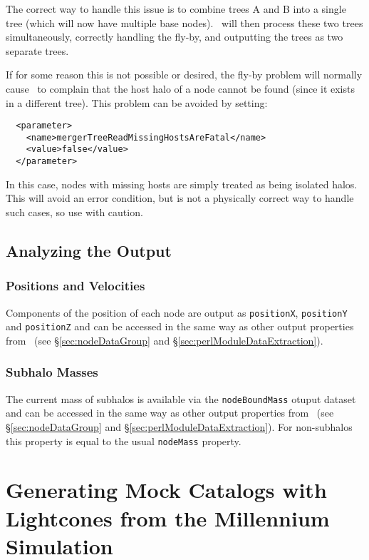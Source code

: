 The correct way to handle this issue is to combine trees A and B into a single tree (which will now have multiple base nodes). \glc\ will then process these two trees simultaneously, correctly handling the fly-by, and outputting the trees as two separate trees.

If for some reason this is not possible or desired, the fly-by problem will normally cause \glc\ to complain that the host halo of a node cannot be found (since it exists in a different tree). This problem can be avoided by setting:
\begin{verbatim}
  <parameter>
    <name>mergerTreeReadMissingHostsAreFatal</name>
    <value>false</value>
  </parameter>
\end{verbatim}
In this case, nodes with missing hosts are simply treated as being isolated halos. This will avoid an error condition, but is not a physically correct way to handle such cases, so use with caution.

\subsection{Analyzing the Output}

\subsubsection{Positions and Velocities}

Components of the position of each node are output as {\tt positionX}, {\tt positionY} and {\tt positionZ} and can be accessed in the same way as other output properties from \glc\ (see \S\ref{sec:nodeDataGroup} and \S\ref{sec:perlModuleDataExtraction}).

\subsubsection{Subhalo Masses}

The current mass of subhalos is available via the {\tt nodeBoundMass} otuput dataset and can be accessed in the same way as other output properties from \glc\ (see \S\ref{sec:nodeDataGroup} and \S\ref{sec:perlModuleDataExtraction}). For non-subhalos this property is equal to the usual {\tt nodeMass} property.

\section{Generating Mock Catalogs with Lightcones from the Millennium Simulation}

